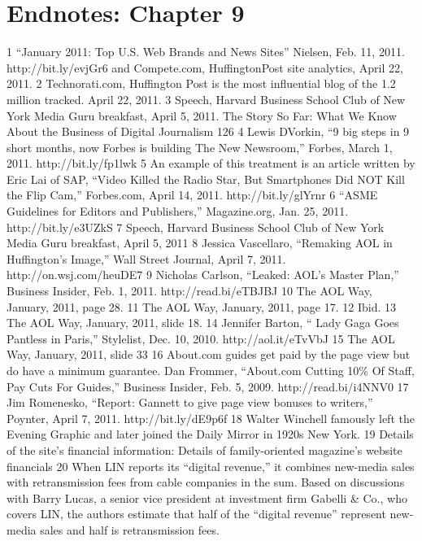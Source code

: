 \section{Endnotes: Chapter 9}
1 ``January 2011: Top U.S. Web Brands and News Sites'' Nielsen, Feb. 11, 2011.
http://bit.ly/evjGr6 and Compete.com, HuffingtonPost site analytics, April 22, 2011.
2 Technorati.com, Huffington Post is the most influential blog of the 1.2 million tracked.
April 22, 2011.
3 Speech, Harvard Business School Club of New York Media Guru breakfast, April 5, 2011.
The Story So Far: What We Know About the Business of Digital Journalism
126
4 Lewis DVorkin, ``9 big steps in 9 short months, now Forbes is building The New Newsroom,''
Forbes, March 1, 2011. http://bit.ly/fp1lwk
5 An example of this treatment is an article written by Eric Lai of SAP, ``Video Killed the
Radio Star, But Smartphones Did NOT Kill the Flip Cam,'' Forbes.com, April 14, 2011.
http://bit.ly/glYrnr
6 ``ASME Guidelines for Editors and Publishers,'' Magazine.org, Jan. 25, 2011.
http://bit.ly/e3UZkS
7 Speech, Harvard Business School Club of New York Media Guru breakfast, April 5, 2011
8 Jessica Vascellaro, ``Remaking AOL in Huffington's Image,'' Wall Street Journal, April 7, 2011.
http://on.wsj.com/heuDE7
9 Nicholas Carlson, ``Leaked: AOL's Master Plan,'' Business Insider, Feb. 1, 2011.
http://read.bi/eTBJBJ
10 The AOL Way, January, 2011, page 28.
11 The AOL Way, January, 2011, page 17.
12 Ibid.
13 The AOL Way, January, 2011, slide 18.
14 Jennifer Barton, `` Lady Gaga Goes Pantless in Paris,'' Stylelist, Dec. 10, 2010.
http://aol.it/eTvVbJ
15 The AOL Way, January, 2011, slide 33
16 About.com guides get paid by the page view but do have a minimum guarantee. Dan Frommer,
``About.com Cutting 10\% Of Staff, Pay Cuts For Guides,'' Business Insider, Feb. 5, 2009.
http://read.bi/i4NNV0
17 Jim Romenesko, ``Report: Gannett to give page view bonuses to writers,'' Poynter,
April 7, 2011. http://bit.ly/dE9p6f
18 Walter Winchell famously left the Evening Graphic and later joined the Daily Mirror in 1920s
New York.
19 Details of the site's financial information:
Details of family-oriented magazine's website financials
20 When LIN reports its ``digital revenue,'' it combines new-media sales with retransmission fees
from cable companies in the sum. Based on discussions with Barry Lucas, a senior vice president
at investment firm Gabelli & Co., who covers LIN, the authors estimate that half of the
``digital revenue'' represent new-media sales and half is retransmission fees.
